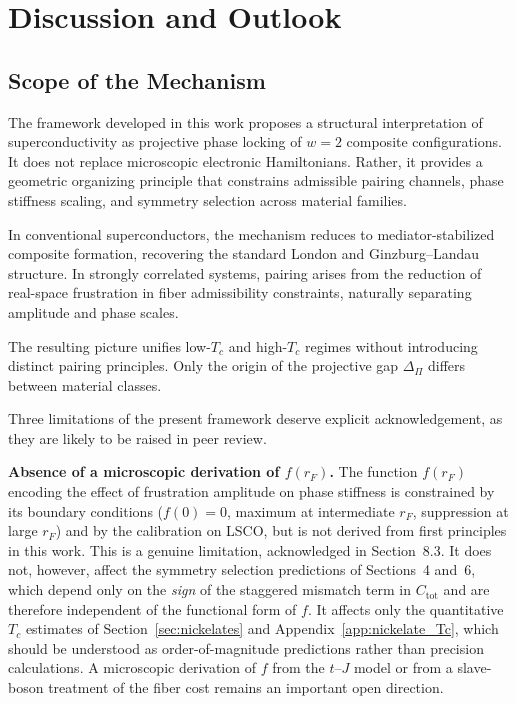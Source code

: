 \section{Discussion and Outlook}
  \label{sec:discussion}

  \subsection{Scope of the Mechanism}
    \label{subsec:scope}

    The framework developed in this work
    proposes a structural interpretation of superconductivity
    as projective phase locking of $w=2$ composite configurations.
    It does not replace microscopic electronic Hamiltonians.
    Rather, it provides a geometric organizing principle
    that constrains admissible pairing channels,
    phase stiffness scaling,
    and symmetry selection
    across material families.

    In conventional superconductors,
    the mechanism reduces to mediator-stabilized composite formation,
    recovering the standard London and Ginzburg--Landau structure.
    In strongly correlated systems,
    pairing arises from the reduction of real-space frustration
    in fiber admissibility constraints,
    naturally separating amplitude and phase scales.

    The resulting picture unifies
    low-$T_c$ and high-$T_c$ regimes
    without introducing distinct pairing principles.
    Only the origin of the projective gap $\Delta_\Pi$
    differs between material classes.

    Three limitations of the present framework deserve explicit acknowledgement, as they
    are likely to be raised in peer review.

    \textbf{Absence of a microscopic derivation of $f(r_F)$.}
    The function $f(r_F)$ encoding the effect of frustration amplitude on phase stiffness
    is constrained by its boundary conditions ($f(0) = 0$, maximum at intermediate $r_F$,
    suppression at large $r_F$) and by the calibration on LSCO, but is not derived from
    first principles in this work.
    This is a genuine limitation, acknowledged in Section~8.3.
    It does not, however, affect the symmetry selection predictions of Sections~4 and~6,
    which depend only on the \emph{sign} of the staggered mismatch term in $C_\textrm{tot}$
    and are therefore independent of the functional form of $f$.
    It affects only the quantitative $T_c$ estimates of Section~\ref{sec:nickelates} and
    Appendix~\ref{app:nickelate_Tc}, which should be understood as order-of-magnitude predictions rather than precision
    calculations.
    A microscopic derivation of $f$ from the $t$--$J$ model or from a slave-boson treatment
    of the fiber cost remains an important open direction.

